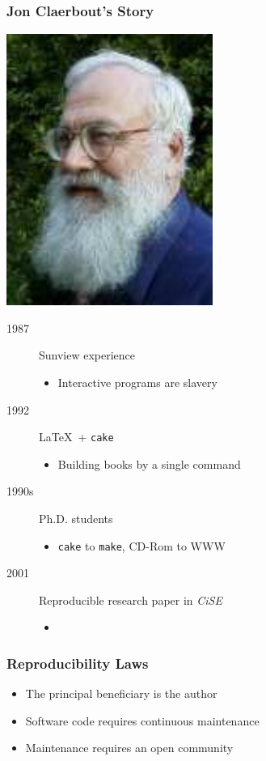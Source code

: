 \begin{frame}
  \MadLogo
  \frametitle{Jon Claerbout's Story}

  {\flushright
  \includegraphics[height=0.2\textheight]{Fig/Claerbout}
  } 

  \begin{description}
  \item[1987] Sunview experience
  \begin{itemize}
  \item	Interactive programs are slavery
  \end{itemize}
  \item[1992] \LaTeX\ + \texttt{cake}
  \begin{itemize}
  \item Building books by a single command
  \end{itemize}
  \item[1990s] Ph.D. students
  \begin{itemize}
  \item \texttt{cake} to \texttt{make}, CD-Rom to WWW
  \end{itemize}
  \item[2001] Reproducible research paper in \emph{CiSE}
  \begin{itemize}
  \item {\color{blue}{The principal beneficiary is the author}}
  \end{itemize}
  \end{description}
\end{frame}

\begin{frame}
  \MadLogo
  \frametitle{Reproducibility Laws}
  \begin{itemize}
  \item The principal beneficiary is the author
  \item Software code requires continuous maintenance
  \item Maintenance requires an open community
  \end{itemize}
\end{frame}

